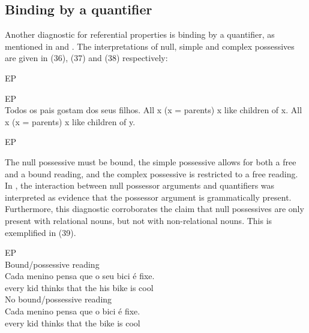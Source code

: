 \documentclass[output=paper]{langsci/langscibook}
\begin{document}
\subsection{Binding by a quantifier}%

Another diagnostic for referential properties is binding by a quantifier, as mentioned in \citet{Barker2011} and \citet{Mateus2003}. The interpretations of null, simple and complex possessives are given in (36), (37) and (38) respectively:

\ea%
    EP\label{ex:wein:36}\\
    \z
\z    

\ea%
        EP\label{ex:wein:37}\\
    \ea Todos os pais gostam dos seus filhos.
    \ex All x (x = parents) x like children of x.
    \ex All x (x = parents) x like children of y.
    \z  
\z


\ea%
    EP\label{ex:wein:38}\\
    \z
\z

The null possessive must be bound, the simple possessive allows for both a free and a bound reading, and the complex possessive is restricted to a free reading. In \citet[1112]{Barker2011}, the interaction between null possessor arguments and quantifiers was interpreted as evidence that the possessor argument is grammatically present. Furthermore, this diagnostic corroborates the claim that null possessives are only present with relational nouns, but not with non-relational nouns. This is exemplified in (39).

\ea%
    EP\label{ex:wein:39}\\
    \ea  Bound/possessive reading\\
    \gll Cada menino pensa que o seu bici é fixe.\\
     every kid thinks that the his bike is cool\\
    \ex  No bound/possessive reading\\
    \gll Cada menino pensa que o bici é fixe.\\
     every kid thinks that the bike is cool\\
    \z
\z
\end{document}
